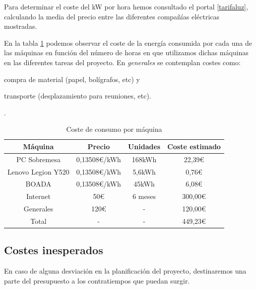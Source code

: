 \documentclass[titlepage,12pt]{report}
\begin{document}
Para determinar el coste del kW por hora hemos consultado el portal \ref{tarifaluz}, calculando la media del precio entre las diferentes compañías eléctricas mostradas. 

En la tabla \ref{ci2} podemos observar el coste de la energía consumida por cada una de las máquinas en función del número de horas en que utilizamos dichas máquinas en las diferentes tareas del proyecto. En \textit{generales} se contemplan costes como: \begin{itemize*}[label=\roman*)] \item compra de material (papel, bolígrafos, etc) y \item transporte (desplazamiento para reuniones, etc). \end{itemize*}. 

\begin{table}[H]
	\centering
	\begin{tabular}{|c|c|c|c|}
		\hline
		\textbf{Máquina} & \textbf{Precio} & \textbf{Unidades} & \textbf{Coste estimado} \\ \hline \hline
		PC Sobremesa 			& 0,13508€/kWh & 168kWh 	&  22,39€ 	\\ \hline
		Lenovo Legion Y520 		& 0,13508€/kWh & 5,6kWh 	&   0,76€ 	\\ \hline
		BOADA 					& 0,13508€/kWh & 45kWh 		&   6,08€ 	\\ \hline 
		Internet				& 50€		   & 6 meses	& 300,00€ 	\\ \hline
		Generales 				& 120€ 		   & -          & 120,00€	\\ \hline \hline
		Total 					& - 		   & -			& 449,23€	\\ \hline
	\end{tabular}
	\caption{Coste de consumo por máquina}
	\label{ci2}
\end{table}

\subsection{Costes inesperados}

En caso de alguna desviación en la planificación del proyecto, destinaremos una parte del presupuesto a los contratiempos que puedan surgir.
\end{document}
